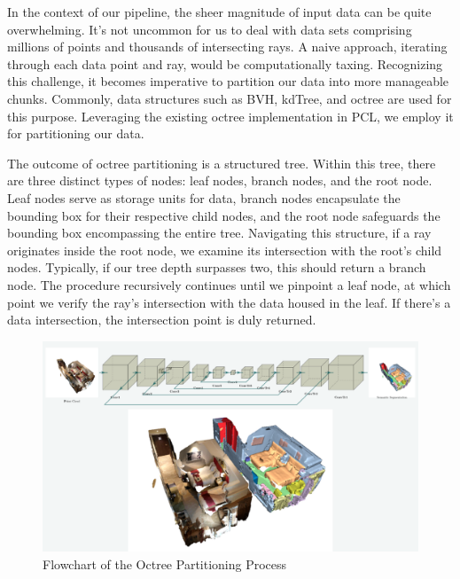 \documentclass[11pt, a4paper,oneside,chapterprefix=false]{scrbook}
\begin{document}
In the context of our pipeline, the sheer magnitude of input data can be quite overwhelming. It's not uncommon for us to deal with data sets comprising millions of points and thousands of intersecting rays. A naive approach, iterating through each data point and ray, would be computationally taxing. Recognizing this challenge, it becomes imperative to partition our data into more manageable chunks. Commonly, data structures such as BVH, kdTree, and octree are used for this purpose. Leveraging the existing octree implementation in PCL, we employ it for partitioning our data.

The outcome of octree partitioning is a structured tree. Within this tree, there are three distinct types of nodes: leaf nodes, branch nodes, and the root node. Leaf nodes serve as storage units for data, branch nodes encapsulate the bounding box for their respective child nodes, and the root node safeguards the bounding box encompassing the entire tree. Navigating this structure, if a ray originates inside the root node, we examine its intersection with the root's child nodes. Typically, if our tree depth surpasses two, this should return a branch node. The procedure recursively continues until we pinpoint a leaf node, at which point we verify the ray's intersection with the data housed in the leaf. If there's a data intersection, the intersection point is duly returned.

\begin{minipage}{\textwidth}
	\begin{figure}[H]
		\centering
		\includegraphics*[width=1.0\textwidth]{figures/Minkowski Engine.png}
		\caption{Flowchart of the Octree Partitioning Process}
		\label{fig:flowchart of the octree partitioning process}
	\end{figure}
\end{minipage}
\end{document}
